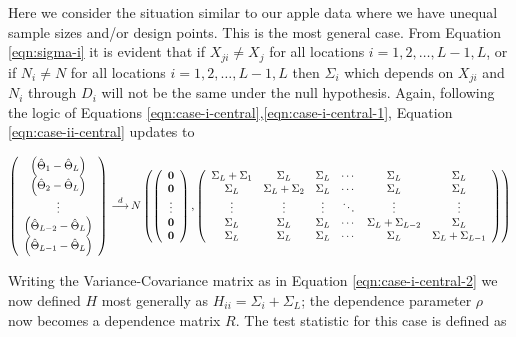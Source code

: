 \documentclass[useAMS]{cJAS2e}
\def\indist{\,{\buildrel d \over \longrightarrow}\,}
\begin{document}
Here we consider the situation similar to our apple data where we have unequal sample sizes and/or design points.  This is the most general case.  From Equation \eqref{eqn:sigma-i} it is evident that if $X_{ji} \neq X_j$ for all locations $i=1,2,\ldots,L-1,L$, or if $N_i \neq N$ for all locations $i=1,2,\ldots,L-1,L$ then $\Sigma_i$ which depends on $X_{ji}$ and $N_i$ through $D_i$ will not be the same under the null hypothesis.  Again, following the logic of Equations \eqref{eqn:case-i-central},\eqref{eqn:case-i-central-1}, Equation \eqref{eqn:case-ii-central} updates to

\begin{equation}\label{eqn:case-iii-central}
	\left(
		\begin{array}{c}
			\left(\hat{\Theta}_1 - \hat{\Theta}_L \right) \\
			\left(\hat{\Theta}_2 - \hat{\Theta}_L  \right) \\
			\vdots \\
			\left(\hat{\Theta}_{L-2} - \hat{\Theta}_L \right) \\
			\left(\hat{\Theta}_{L-1} - \hat{\Theta}_L  \right)
		\end{array}
	\right)  \indist N
	\left(	\left(
		\begin{array}{c}
			\mathbf{0} \\
			\mathbf{0} \\
			\vdots \\
			\mathbf{0} \\
			\mathbf{0}
		\end{array}
		\right),
		\left(
		\begin{array}{cccccc}
			\Sigma_L+\Sigma_1 & \Sigma_L & \Sigma_L & \cdots & \Sigma_L & \Sigma_L \\
			\Sigma_L & \Sigma_L+\Sigma_2 & \Sigma_L & \cdots & \Sigma_L & \Sigma_L \\
			\vdots & \vdots & \vdots & \ddots & \vdots & \vdots \\
			\Sigma_L & \Sigma_L & \Sigma_L & \cdots & \Sigma_L+\Sigma_{L-2} & \Sigma_L \\
			\Sigma_L & \Sigma_L & \Sigma_L & \cdots & \Sigma_L & \Sigma_L+\Sigma_{L-1}
		\end{array}
		\right)
	\right)
\end{equation}

Writing the Variance-Covariance matrix as in Equation \eqref{eqn:case-i-central-2} we now defined $H$ most generally as $H_{ii} = \Sigma_i + \Sigma_L$; the dependence parameter $\rho$ now becomes a dependence matrix $R$.  The test statistic for this case is defined as
\end{document}
